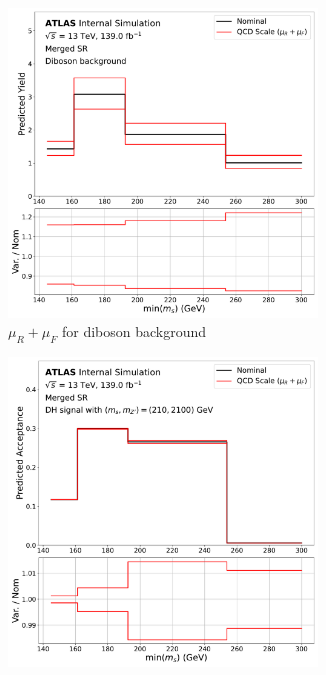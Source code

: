 \begin{figure}[!tb]
  \begin{subfigure}{0.45\textwidth}
      \centering
    \includegraphics[width=0.9\textwidth]{Figures/6/scale_syst_Diboson_SR_mgd_TARJets10_minmS_mgd_symm_scale_yield.pdf}
    \caption{\(\mu_R+\mu_F\) for diboson background}
    \label{fig:diboson_scale}
  \end{subfigure} \hspace{1em}
      \centering
    \begin{subfigure}{0.45\textwidth}
    \includegraphics[width=0.9\textwidth]{Figures/6/scale_syst_monoSWWsemilep_zp2100_dm200_dh210_SR_mgd_TARJets10_minmS_mgd_symm_scale.pdf}

\end{subfigure}
\end{figure}
